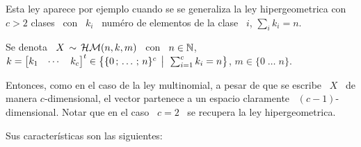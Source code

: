 \label{Sssec:MP:HipergeometricaMultivariada}

Esta ley aparece por ejemplo cuando  se se generaliza la ley hipergeometrica con
$c > 2$ clases \ con \ $k_i$  \ num\'ero de elementos de la clase \ $i$, $\sum_i
k_i = n$.

Se denota \ $X \, \sim \, \mathcal{H}\mathcal{M}(n,k,m)$ \ con \ $\displaystyle n \in \mathbb{N}$, \quad
$k = \begin{bmatrix} k_1 & \cdots & k_c\end{bmatrix}^t \in \left\{ \{ 0 \, ; \, \ldots
  \, ; \, n\}^c  \:\: \big| \:\: \sum_{i=1}^c k_i  = n \right\}$,  \quad $m \in  \{ 0 \;  \ldots \;
n\}$.

Entonces, como en el caso de la ley multinomial, a pesar de que se escribe \ $X$
\  de manera  $c$-dimensional, el  vector partenece  a un  espacio  claramente \
$(c-1)$-dimensional.  Notar que  en el  caso \  $c  = 2$  \ se  recupera la  ley
hipergeometrica.

Sus caracter\'isticas son las siguientes:

